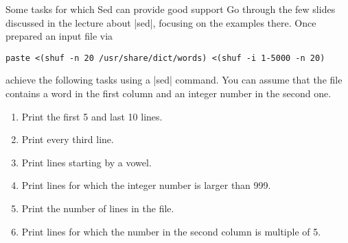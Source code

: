 
\begin{exercise}[Instructive]{Some tasks for which Sed can provide good support}
    Go through the few slides discussed in the lecture about \bash|sed|, focusing on the examples there.
    Once prepared an input file via
    \begin{lstlisting}[style=MyBash]
        paste <(shuf -n 20 /usr/share/dict/words) <(shuf -i 1-5000 -n 20)
    \end{lstlisting}
    achieve the following tasks using a \bash|sed| command.
    You can assume that the file contains a word in the first column and an integer number in the second one.
    \begin{enumerate}
        \item Print the first 5 and last 10 lines.
        \item Print every third line.
        \item Print lines starting by a vowel.
        \item Print lines for which the integer number is larger than 999.
        \item Print the number of lines in the file.
        \item Print lines for which the number in the second column is multiple of 5.
    \end{enumerate}
\end{exercise}
